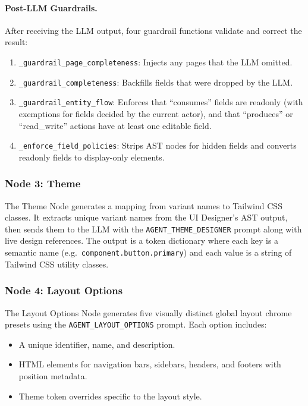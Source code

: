 \paragraph{Post-LLM Guardrails.}
After receiving the LLM output, four guardrail functions validate and correct the result:
\begin{enumerate}
    \item \texttt{\_guardrail\_page\_completeness}: Injects any pages that the LLM omitted.
    \item \texttt{\_guardrail\_completeness}: Backfills fields that were dropped by the LLM.
    \item \texttt{\_guardrail\_entity\_flow}: Enforces that ``consumes'' fields are readonly (with exemptions for fields decided by the current actor), and that ``produces'' or ``read\_write'' actions have at least one editable field.
    \item \texttt{\_enforce\_field\_policies}: Strips AST nodes for hidden fields and converts readonly fields to display-only elements.
\end{enumerate}


\subsubsection{Node 3: Theme}

The Theme Node generates a mapping from variant names to Tailwind CSS classes. It extracts unique variant names from the UI Designer's AST output, then sends them to the LLM with the \texttt{AGENT\_THEME\_DESIGNER} prompt along with live design references. The output is a token dictionary where each key is a semantic name (e.g.\ \texttt{component.button.primary}) and each value is a string of Tailwind CSS utility classes.


\subsubsection{Node 4: Layout Options}

The Layout Options Node generates five visually distinct global layout chrome presets using the \texttt{AGENT\_LAYOUT\_OPTIONS} prompt. Each option includes:
\begin{itemize}
    \item A unique identifier, name, and description.
    \item HTML elements for navigation bars, sidebars, headers, and footers with position metadata.
    \item Theme token overrides specific to the layout style.
\end{itemize}

